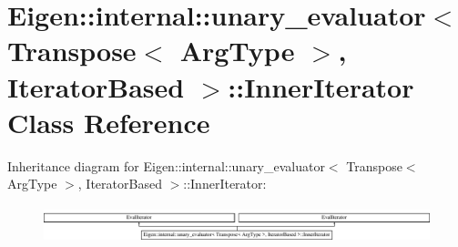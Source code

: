 \hypertarget{class_eigen_1_1internal_1_1unary__evaluator_3_01_transpose_3_01_arg_type_01_4_00_01_iterator_based_01_4_1_1_inner_iterator}{}\section{Eigen\+:\+:internal\+:\+:unary\+\_\+evaluator$<$ Transpose$<$ Arg\+Type $>$, Iterator\+Based $>$\+:\+:Inner\+Iterator Class Reference}
\label{class_eigen_1_1internal_1_1unary__evaluator_3_01_transpose_3_01_arg_type_01_4_00_01_iterator_based_01_4_1_1_inner_iterator}
Inheritance diagram for Eigen\+:\+:internal\+:\+:unary\+\_\+evaluator$<$ Transpose$<$ Arg\+Type $>$, Iterator\+Based $>$\+:\+:Inner\+Iterator\+:\begin{figure}[H]
\begin{center}
\leavevmode
\includegraphics[height=1.089494cm]{class_eigen_1_1internal_1_1unary__evaluator_3_01_transpose_3_01_arg_type_01_4_00_01_iterator_based_01_4_1_1_inner_iterator}
\end{center}
\end{figure}
